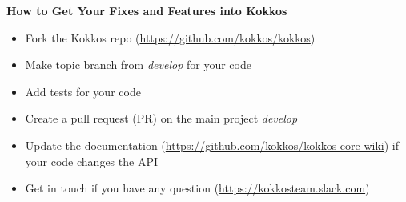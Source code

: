 








\begin{frame}[fragile]

  \vspace{10pt}

  \textbf{How to Get Your Fixes and Features into Kokkos}
  \newline
  \begin{itemize}
    \item Fork the Kokkos repo (\url{https://github.com/kokkos/kokkos})
    \item Make topic branch from \textit{develop} for your code
    \item Add tests for your code
    \item Create a pull request (PR) on the main project \textit{develop}
    \item Update the documentation (\url{https://github.com/kokkos/kokkos-core-wiki}) if your code changes the API
    \item Get in touch if you have any question (\url{https://kokkosteam.slack.com})
  \end{itemize}

\end{frame}



